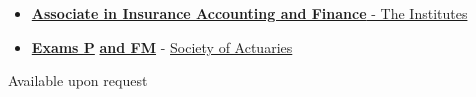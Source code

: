 \documentclass[9pt]{developercv} %
\begin{document}

\begin{minipage}[t]{0.46\textwidth}
	\vspace{-\baselineskip} %

	\vspace{-10pt}
	\begin{itemize}[leftmargin=*]
		\setlength{\itemsep}{0pt}
		\setlength{\parskip}{0pt}
		\setlength{\parsep}{0pt}
		\item\href{https://web.theinstitutes.org/designations/associate-insurance-accounting-and-finance}{\textbf{Associate in Insurance Accounting and Finance} - The Institutes}
		\item\href{https://www.soa.org/education/exam-req/edu-exam-p-detail/}{\textbf{Exams P}} \href{https://www.soa.org/education/exam-req/edu-exam-fm-detail/}{\textbf{and FM}} - \href{https://www.soa.org/}{Society of Actuaries}
	\end{itemize}
\end{minipage}
\hspace{0.5cm}
\begin{minipage}[t]{0.46\textwidth}
	\vspace{-\baselineskip} %
	
	\vspace{-4pt}
	
	Available upon request
\end{minipage}

\end{document}
